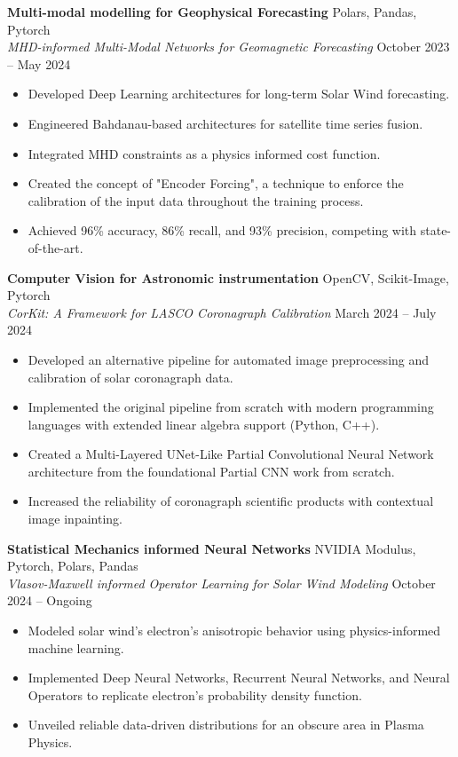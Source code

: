 \documentclass[11pt]{article}
\begin{document}
\textbf{Multi-modal modelling for Geophysical Forecasting} \hfill Polars, Pandas, Pytorch \\
\textit{MHD-informed Multi-Modal Networks for Geomagnetic Forecasting} \hfill October 2023 – May 2024
\begin{itemize}[noitemsep]
    \item Developed Deep Learning architectures for long-term Solar Wind forecasting.
    \item Engineered Bahdanau-based architectures for satellite time series fusion.
    \item Integrated MHD constraints as a physics informed cost function.
    \item Created the concept of "Encoder Forcing", a technique to enforce the calibration of the input data throughout the training process.
    \item Achieved 96\% accuracy, 86\% recall, and 93\% precision, competing with state-of-the-art.
\end{itemize}

\textbf{Computer Vision for Astronomic instrumentation} \hfill OpenCV, Scikit-Image, Pytorch \\
\textit{CorKit: A Framework for LASCO Coronagraph Calibration} \hfill March 2024 – July 2024
\begin{itemize}[noitemsep]
    \item Developed an alternative pipeline for automated image preprocessing and calibration of solar coronagraph data.
    \item Implemented the original pipeline \cite{lasco} from scratch with modern programming languages with extended linear algebra support (Python, C++).
    \item Created a Multi-Layered UNet-Like Partial Convolutional Neural Network architecture from the foundational Partial CNN work \cite{conv} from scratch.
    \item Increased the reliability of coronagraph scientific products with contextual image inpainting.
\end{itemize}

\textbf{Statistical Mechanics informed Neural Networks} \hfill NVIDIA Modulus, Pytorch, Polars, Pandas \\
\textit{Vlasov-Maxwell informed Operator Learning for Solar Wind Modeling} \hfill October 2024 – Ongoing
\begin{itemize}[noitemsep]
    \item Modeled solar wind's electron's anisotropic behavior using physics-informed machine learning.
    \item Implemented Deep Neural Networks, Recurrent Neural Networks, and Neural Operators to replicate electron's probability density function.
    \item Unveiled reliable data-driven distributions for an obscure area in Plasma Physics.
\end{itemize}
\end{document}
